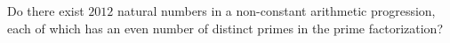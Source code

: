 \problem{}
Do there exist $2012$ natural numbers in a non-constant arithmetic progression, each of
which has an even number of distinct primes in the prime factorization?
\solution
\endproblem
